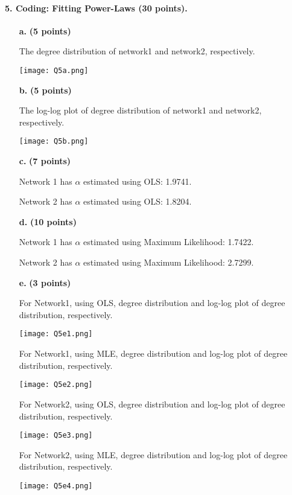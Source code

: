 \documentclass[11pt]{article} %
\begin{document}
\paragraph{5. Coding: Fitting Power-Laws (30 points).}


\begin{itemize}
	\item[\textbf{a.}] \textbf{(5 points)} 

The degree distribution of network1 and network2, respectively.

	\texttt{[image: Q5a.png]}

	\item[\textbf{b.}] \textbf{(5 points)} 

The log-log plot of degree distribution of network1 and network2, respectively.

	\texttt{[image: Q5b.png]}

	\item[\textbf{c.}] \textbf{(7 points)} 
 
Network 1 has $\alpha$ estimated using OLS: 1.9741. 

Network 2 has $\alpha$ estimated using OLS: 1.8204.

	\item[\textbf{d.}] \textbf{(10 points)} 
 
Network 1 has $\alpha$ estimated using Maximum Likelihood: 1.7422.

Network 2 has $\alpha$ estimated using Maximum Likelihood: 2.7299.

	\item[\textbf{e.}] \textbf{(3 points)}

For Network1, using OLS, degree distribution and log-log plot of degree distribution, respectively. 

	\texttt{[image: Q5e1.png]}

For Network1, using MLE, degree distribution and log-log plot of degree distribution, respectively. 

	\texttt{[image: Q5e2.png]}

For Network2, using OLS, degree distribution and log-log plot of degree distribution, respectively. 

	\texttt{[image: Q5e3.png]}

For Network2, using MLE, degree distribution and log-log plot of degree distribution, respectively. 

	\texttt{[image: Q5e4.png]}



\end{itemize}
\end{document}
